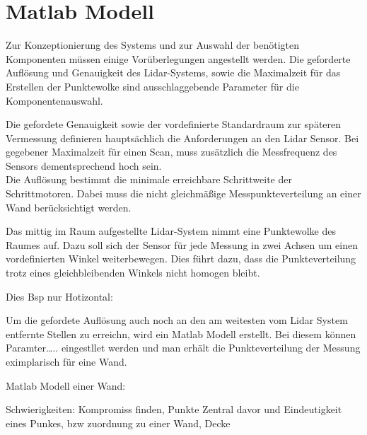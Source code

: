 

\chapter{Matlab Modell}

Zur Konzeptionierung des Systems und zur Auswahl der benötigten Komponenten müssen einige Vorüberlegungen angestellt werden. Die geforderte Auflösung und Genauigkeit des Lidar-Systems, sowie die Maximalzeit für das Erstellen der Punktewolke sind ausschlaggebende Parameter für die Komponentenauswahl.

Die gefordete Genauigkeit sowie der vordefinierte Standardraum zur späteren Vermessung definieren hauptsächlich die Anforderungen an den Lidar Sensor. Bei gegebener Maximalzeit für einen Scan, muss zusätzlich die Messfrequenz des Sensors dementsprechend hoch sein. \\
Die Auflösung bestimmt die minimale erreichbare Schrittweite der Schrittmotoren. Dabei muss die nicht gleichmäßige Messpunkteverteilung an einer Wand berücksichtigt werden.

Das mittig im Raum aufgestellte Lidar-System nimmt eine Punktewolke des Raumes auf. Dazu soll sich der Sensor für jede Messung in zwei Achsen um einen vordefinierten Winkel weiterbewegen. Dies führt dazu, dass die Punkteverteilung trotz eines gleichbleibenden Winkels nicht homogen bleibt. 

Dies
Bsp nur Hotizontal:


Um die gefordete Auflösung auch noch an den am weitesten vom Lidar System entfernte Stellen zu erreichn, wird ein Matlab Modell erstellt. Bei diesem können Paramter….. eingestllet werden und man erhält die Punkteverteilung der Messung eximplarisch für eine Wand.

Matlab Modell einer Wand:

Schwierigkeiten:
Kompromiss finden, Punkte Zentral davor und 
Eindeutigkeit eines Punkes, bzw zuordnung zu einer Wand, Decke